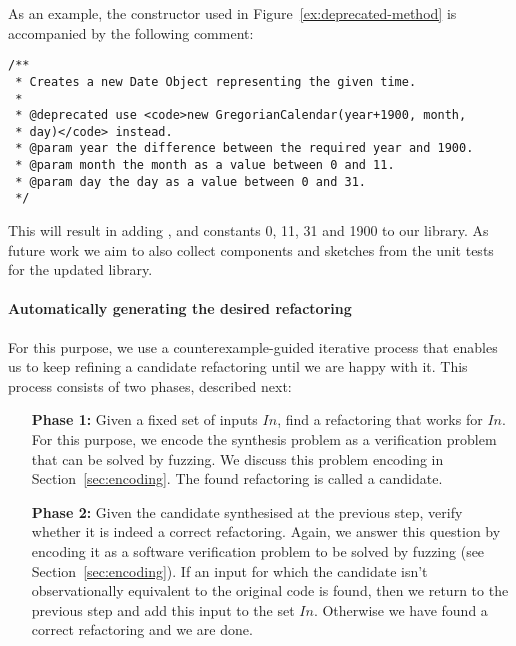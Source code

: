 \documentclass[runningheads,a4paper]{llncs}
\begin{document}

As an example, the  constructor used in Figure~\ref{ex:deprecated-method} is accompanied by the following comment:

\begin{lstlisting}[mathescape=true,showstringspaces=false]
/**
 * Creates a new Date Object representing the given time.
 *
 * @deprecated use <code>new GregorianCalendar(year+1900, month,
 * day)</code> instead.
 * @param year the difference between the required year and 1900.
 * @param month the month as a value between 0 and 11.
 * @param day the day as a value between 0 and 31.
 */
\end{lstlisting}

This will result in adding ,  and constants 0, 11, 31 and 1900 to our library. 
As future work we aim to also collect components and sketches from the  unit tests for the updated library.
 
\paragraph{{\bf Automatically generating the desired refactoring}} For this purpose, we use a counterexample-guided iterative process that enables us to keep refining a candidate refactoring until we are happy with it. This process consists of two phases, described next:
  \begin{itemize}
  \item[{\bf Phase 1:}] Given a fixed set of inputs $In$, find a refactoring that works for $In$. For this purpose, we encode   
    the synthesis problem as a verification problem that can be solved by fuzzing. We discuss this problem encoding in
    Section~\ref{sec:encoding}. The found refactoring is called a candidate.
  \item[{\bf Phase 2:}] Given the candidate synthesised at the previous step, verify whether it is indeed a correct refactoring.
    Again, we answer this question by encoding it as a software verification problem to be solved by fuzzing (see Section~\ref{sec:encoding}).
    If an input for which the candidate isn't observationally equivalent to the original code is found, then
    we return to the previous step and add this input to the set $In$. Otherwise we have found a correct refactoring and we are done.
  \end{itemize}
\end{document}
